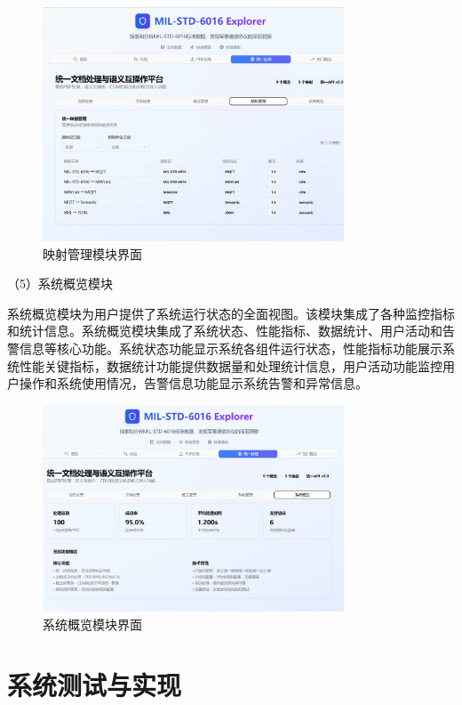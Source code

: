 \begin{figure}[H]
\centering
\includegraphics[width=0.8\textwidth]{chapters/fig-0/front_project.png}
\caption{映射管理模块界面}
\label{fig:frontend-mapping}
\end{figure}

（5）系统概览模块

系统概览模块为用户提供了系统运行状态的全面视图。该模块集成了各种监控指标和统计信息。系统概览模块集成了系统状态、性能指标、数据统计、用户活动和告警信息等核心功能。系统状态功能显示系统各组件运行状态，性能指标功能展示系统性能关键指标，数据统计功能提供数据量和处理统计信息，用户活动功能监控用户操作和系统使用情况，告警信息功能显示系统告警和异常信息。

\begin{figure}[H]
\centering
\includegraphics[width=0.8\textwidth]{chapters/fig-0/front_overview.png}
\caption{系统概览模块界面}
\label{fig:frontend-overview}
\end{figure}




\section{系统测试与实现}

